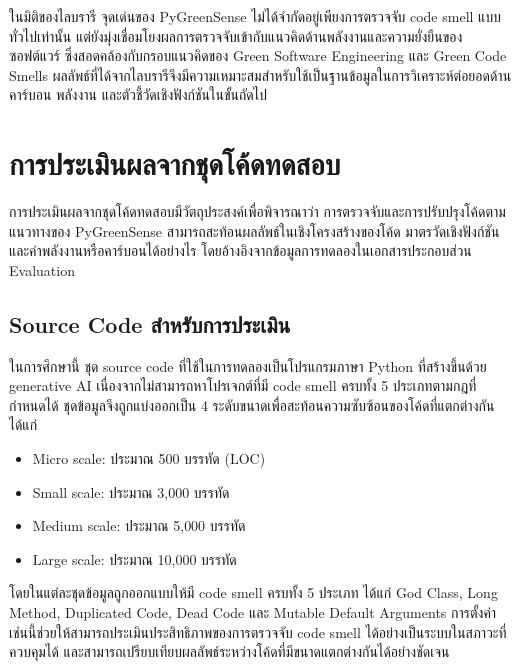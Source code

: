ในมิติของไลบรารี จุดเด่นของ {\italicfont PyGreenSense} ไม่ได้จำกัดอยู่เพียงการตรวจจับ {\italicfont code smell} แบบทั่วไปเท่านั้น แต่ยังมุ่งเชื่อมโยงผลการตรวจจับเข้ากับแนวคิดด้านพลังงานและความยั่งยืนของซอฟต์แวร์ ซึ่งสอดคล้องกับกรอบแนวคิดของ {\italicfont Green Software Engineering} และ {\italicfont Green Code Smells} \cite{leGoaer2024tactics,legoaer2023ecocode} ผลลัพธ์ที่ได้จากไลบรารีจึงมีความเหมาะสมสำหรับใช้เป็นฐานข้อมูลในการวิเคราะห์ต่อยอดด้านคาร์บอน พลังงาน และตัวชี้วัดเชิงฟังก์ชันในขั้นถัดไป


\section{การประเมินผลจากชุดโค้ดทดสอบ}

การประเมินผลจากชุดโค้ดทดสอบมีวัตถุประสงค์เพื่อพิจารณาว่า การตรวจจับและการปรับปรุงโค้ดตามแนวทางของ {\italicfont PyGreenSense} สามารถสะท้อนผลลัพธ์ในเชิงโครงสร้างของโค้ด มาตรวัดเชิงฟังก์ชัน และค่าพลังงานหรือคาร์บอนได้อย่างไร โดยอ้างอิงจากข้อมูลการทดลองในเอกสารประกอบส่วน {\italicfont Evaluation}

\subsection{Source Code สำหรับการประเมิน}

ในการศึกษานี้ ชุด {\italicfont source code} ที่ใช้ในการทดลองเป็นโปรแกรมภาษา Python ที่สร้างขึ้นด้วย {\italicfont generative AI} เนื่องจากไม่สามารถหาโปรเจกต์ที่มี {\italicfont code smell} ครบทั้ง 5 ประเภทตามกฎที่กำหนดได้ ชุดข้อมูลจึงถูกแบ่งออกเป็น 4 ระดับขนาดเพื่อสะท้อนความซับซ้อนของโค้ดที่แตกต่างกัน ได้แก่

\begin{itemize}
    \item {\boldfont Micro scale}: ประมาณ 500 บรรทัด (LOC)
    \item {\boldfont Small scale}: ประมาณ 3{,}000 บรรทัด
    \item {\boldfont Medium scale}: ประมาณ 5{,}000 บรรทัด
    \item {\boldfont Large scale}: ประมาณ 10{,}000 บรรทัด
\end{itemize}

โดยในแต่ละชุดข้อมูลถูกออกแบบให้มี {\italicfont code smell} ครบทั้ง 5 ประเภท ได้แก่ {\italicfont God Class}, {\italicfont Long Method}, {\italicfont Duplicated Code}, {\italicfont Dead Code} และ {\italicfont Mutable Default Arguments} การตั้งค่าเช่นนี้ช่วยให้สามารถประเมินประสิทธิภาพของการตรวจจับ {\italicfont code smell} ได้อย่างเป็นระบบในสภาวะที่ควบคุมได้ และสามารถเปรียบเทียบผลลัพธ์ระหว่างโค้ดที่มีขนาดแตกต่างกันได้อย่างชัดเจน

